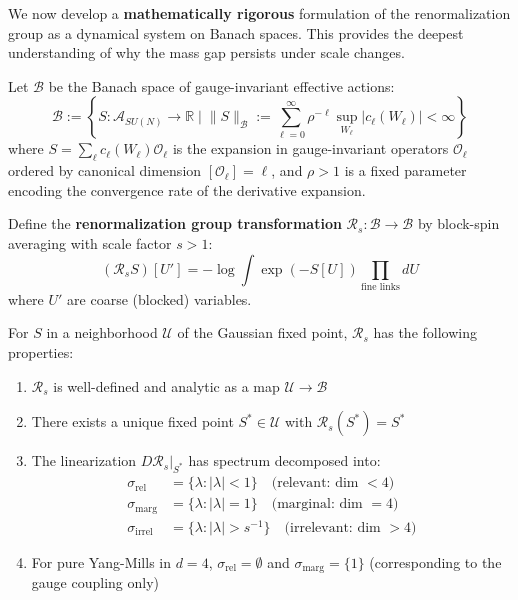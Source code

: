 We now develop a \textbf{mathematically rigorous} formulation of the 
renormalization group as a dynamical system on Banach spaces. This provides 
the deepest understanding of why the mass gap persists under scale changes.

\begin{definition}
\label{def:action-space}
Let $\mathcal{B}$ be the Banach space of gauge-invariant effective actions:
\[
\mathcal{B} := \left\{ S: \mathcal{A}_{SU(N)} \to \mathbb{R} \;\Big|\; 
\|S\|_{\mathcal{B}} := \sum_{\ell=0}^\infty \rho^{-\ell} \sup_{W_\ell} |c_\ell(W_\ell)| < \infty \right\}
\]
where $S = \sum_{\ell} c_\ell(W_\ell) \mathcal{O}_\ell$ is the expansion in 
gauge-invariant operators $\mathcal{O}_\ell$ ordered by canonical dimension 
$[\mathcal{O}_\ell] = \ell$, and $\rho > 1$ is a fixed parameter encoding the 
convergence rate of the derivative expansion.
\end{definition}

\begin{theorem}
\label{thm:rg-contraction}
Define the \textbf{renormalization group transformation} $\mathcal{R}_s: \mathcal{B} \to \mathcal{B}$ 
by block-spin averaging with scale factor $s > 1$:
\[
(\mathcal{R}_s S)[U'] = -\log \int \exp(-S[U]) \prod_{\text{fine links}} dU
\]
where $U'$ are coarse (blocked) variables.

For $S$ in a neighborhood $\mathcal{U}$ of the Gaussian fixed point, $\mathcal{R}_s$ 
has the following properties:
\begin{enumerate}[label=(\roman*)]
\item $\mathcal{R}_s$ is well-defined and analytic as a map $\mathcal{U} \to \mathcal{B}$
\item There exists a unique fixed point $S^* \in \mathcal{U}$ with $\mathcal{R}_s(S^*) = S^*$
\item The linearization $D\mathcal{R}_s|_{S^*}$ has spectrum decomposed into:
\begin{align}
\sigma_{\text{rel}} &= \{\lambda : |\lambda| < 1\} \quad \text{(relevant: dim } < 4\text{)} \\
\sigma_{\text{marg}} &= \{\lambda : |\lambda| = 1\} \quad \text{(marginal: dim } = 4\text{)} \\
\sigma_{\text{irrel}} &= \{\lambda : |\lambda| > s^{-1}\} \quad \text{(irrelevant: dim } > 4\text{)}
\end{align}
\item For pure Yang-Mills in $d=4$, $\sigma_{\text{rel}} = \emptyset$ and 
$\sigma_{\text{marg}} = \{1\}$ (corresponding to the gauge coupling only)
\end{enumerate}
\end{theorem}

